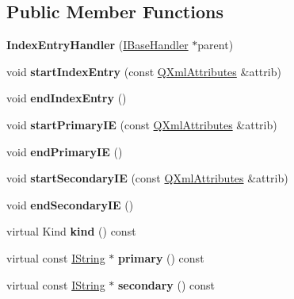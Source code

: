 \subsection*{Public Member Functions}
\begin{DoxyCompactItemize}
\item 
\mbox{\label{class_index_entry_handler_a7bd44d11b045262fcb3f519b7a2fa6f6}} 
{\bfseries Index\+Entry\+Handler} (\mbox{\hyperlink{class_i_base_handler}{I\+Base\+Handler}} $\ast$parent)
\item 
\mbox{\label{class_index_entry_handler_a99c61049a71bca69ffb3b92420b8b81c}} 
void {\bfseries start\+Index\+Entry} (const \mbox{\hyperlink{class_q_xml_attributes}{Q\+Xml\+Attributes}} \&attrib)
\item 
\mbox{\label{class_index_entry_handler_ad713f10bdcc0ebf1896fab2be18a1ebd}} 
void {\bfseries end\+Index\+Entry} ()
\item 
\mbox{\label{class_index_entry_handler_a068d1e30b0687fa99917ace7bc41fbc2}} 
void {\bfseries start\+Primary\+IE} (const \mbox{\hyperlink{class_q_xml_attributes}{Q\+Xml\+Attributes}} \&attrib)
\item 
\mbox{\label{class_index_entry_handler_ab48d2f416ebc4bc0d339cdcae8a8ce92}} 
void {\bfseries end\+Primary\+IE} ()
\item 
\mbox{\label{class_index_entry_handler_ac5b3aed18322f73449b725e036612671}} 
void {\bfseries start\+Secondary\+IE} (const \mbox{\hyperlink{class_q_xml_attributes}{Q\+Xml\+Attributes}} \&attrib)
\item 
\mbox{\label{class_index_entry_handler_ade626cede7cd69d868296d5db687542c}} 
void {\bfseries end\+Secondary\+IE} ()
\item 
\mbox{\label{class_index_entry_handler_a7339e1142607ca63a62b92bc17f13d82}} 
virtual Kind {\bfseries kind} () const
\item 
\mbox{\label{class_index_entry_handler_ac4bc209ebd3fe6c463b7e447a1713807}} 
virtual const \mbox{\hyperlink{class_i_string}{I\+String}} $\ast$ {\bfseries primary} () const
\item 
\mbox{\label{class_index_entry_handler_a0e97205fd258f6938b2bc45fb39f5b3c}} 
virtual const \mbox{\hyperlink{class_i_string}{I\+String}} $\ast$ {\bfseries secondary} () const
\end{DoxyCompactItemize}
